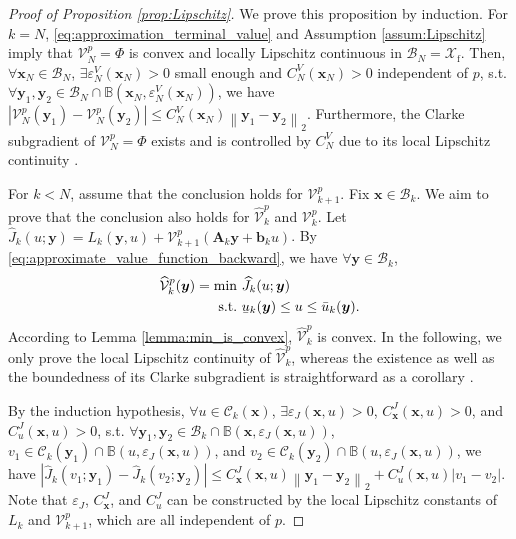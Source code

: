\documentclass[journal]{IEEEtran}
\theoremstyle{definition}
\theoremstyle{definition}
\newcommand\norm[2][1]{\left\|#2\right\|_{#1}}
\newcommand\abs[1]{\left|#1\right|}
\newcommand\st{{\text{s.t.}}}
\renewcommand\vector[1]{\boldsymbol{#1}}
\newcommand\vb{{\vector{b}}}
\newcommand\vx{{\vector{x}}}
\newcommand\vy{{\vector{y}}}
\newcommand\vA{{\vector{A}}}
\DeclareRobustCommand{\underbar}[1]{\kern0.3\fontdimen2\font\underaccent{\bar}{\kern-0.3\fontdimen2\font #1}}
\begin{document}
\begin{proof}[Proof of Proposition \ref{prop:Lipschitz}]
    We prove this proposition by induction. For $k=N$, \eqref{eq:approximation_terminal_value} and Assumption \ref{assum:Lipschitz} imply that $\mathcal{V}_N^p=\Phi$ is convex and locally Lipschitz continuous in $\mathcal{B}_N=\mathcal{X}_\text{f}$. Then, $\forall \vx_N\in\mathcal{B}_N$, $\exists \varepsilon_N^V(\vx_N)>0$ small enough and $C_N^V(\vx_N)>0$ independent of $p$, s.t. $\forall \vy_1,\vy_2\in\mathcal{B}_N\cap\mathbb{B}(\vx_N,\varepsilon_N^V(\vx_N))$, we have $\abs{\mathcal{V}_N^p(\vy_1)-\mathcal{V}_N^p(\vy_2)}\leq C_N^V(\vx_N)\norm[2]{\vy_1-\vy_2}$. Furthermore, the Clarke subgradient of $\mathcal{V}_N^p=\Phi$ exists and is controlled by $C_N^V$ due to its local Lipschitz continuity \cite{clarke1990optimization}.

    For $k<N$, assume that the conclusion holds for $\mathcal{V}_{k+1}^p$. Fix $\vx\in\mathcal{B}_k$. We aim to prove that the conclusion also holds for $\widehat{\mathcal{V}}_k^p$ and $\mathcal{V}_k^p$. Let $\widehat{J}_k(u;\vy)=L_k(\vy, u) + \mathcal{V}_{k+1}^p(\vA_k\vy+\vb_k u)$. By \eqref{eq:approximate_value_function_backward}, we have $\forall \vy\in\mathcal{B}_k$,
    \begin{subequations}\label{eq:approximation_proof}
        \begin{align}
            \widehat{\mathcal{V}}_k^p(\vy) = \min\,\,& \widehat{J}_k(u;\vy) \\
            \st\,\,&\underbar{u}_k(\vy)\leq u\leq \bar{u}_k(\vy).
        \end{align}
    \end{subequations}
    According to Lemma \ref{lemma:min_is_convex}, $\widehat{\mathcal{V}}_k^p$ is convex. In the following, we only prove the local Lipschitz continuity of $\widehat{\mathcal{V}}_k^p$, whereas the existence as well as the boundedness of its Clarke subgradient is straightforward as a corollary \cite{clarke1990optimization}.

    By the induction hypothesis, $\forall u\in\mathcal{C}_k(\vx)$, $\exists \varepsilon_J(\vx,u)>0$, $C_{\vx}^J(\vx,u)>0$, and $C_{u}^J(\vx,u)>0$, s.t. $\forall \vy_1,\vy_2\in\mathcal{B}_k\cap\mathbb{B}(\vx,\varepsilon_J(\vx,u))$, $v_1\in\mathcal{C}_k(\vy_1)\cap\mathbb{B}(u,\varepsilon_J(\vx,u))$, and $v_2\in\mathcal{C}_k(\vy_2)\cap\mathbb{B}(u,\varepsilon_J(\vx,u))$, we have $\abs{\widehat{J}_k(v_1;\vy_1)-\widehat{J}_k(v_2;\vy_2)}\leq C_{\vx}^J(\vx,u)\norm[2]{\vy_1-\vy_2}+C_{u}^J(\vx,u)\abs{v_1-v_2}$. Note that $\varepsilon_J$, $C_{\vx}^J$, and $C_{u}^J$ can be constructed by the local Lipschitz constants of $L_k$ and $\mathcal{V}_{k+1}^p$, which are all independent of $p$.


\end{proof}
\end{document}
